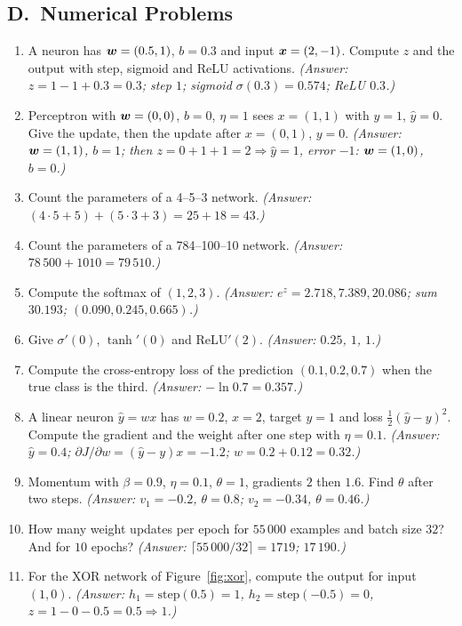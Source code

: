 \subsection*{D.\ Numerical Problems}
\begin{enumerate}
  \item A neuron has $\boldsymbol{w}=(0.5,1)$, $b=0.3$ and input $\boldsymbol{x}=(2,-1)$. Compute $z$ and the output with step, sigmoid and ReLU activations. \textit{(Answer: $z=1-1+0.3=0.3$; step $1$; sigmoid $\sigma(0.3)=0.574$; ReLU $0.3$.)}
  \item Perceptron with $\boldsymbol{w}=(0,0)$, $b=0$, $\eta=1$ sees $x=(1,1)$ with $y=1$, $\hat y=0$. Give the update, then the update after $x=(0,1)$, $y=0$. \textit{(Answer: $\boldsymbol{w}=(1,1)$, $b=1$; then $z=0+1+1=2\Rightarrow\hat y=1$, error $-1$: $\boldsymbol{w}=(1,0)$, $b=0$.)}
  \item Count the parameters of a 4--5--3 network. \textit{(Answer: $(4\cdot5+5)+(5\cdot3+3)=25+18=43$.)}
  \item Count the parameters of a 784--100--10 network. \textit{(Answer: $78\,500+1010=79\,510$.)}
  \item Compute the softmax of $(1,2,3)$. \textit{(Answer: $e^z=2.718,7.389,20.086$; sum $30.193$; $(0.090,0.245,0.665)$.)}
  \item Give $\sigma'(0)$, $\tanh'(0)$ and ReLU$'(2)$. \textit{(Answer: $0.25$, $1$, $1$.)}
  \item Compute the cross-entropy loss of the prediction $(0.1,0.2,0.7)$ when the true class is the third. \textit{(Answer: $-\ln0.7=0.357$.)}
  \item A linear neuron $\hat y=wx$ has $w=0.2$, $x=2$, target $y=1$ and loss $\frac12(\hat y-y)^2$. Compute the gradient and the weight after one step with $\eta=0.1$. \textit{(Answer: $\hat y=0.4$; $\partial J/\partial w=(\hat y-y)x=-1.2$; $w=0.2+0.12=0.32$.)}
  \item Momentum with $\beta=0.9$, $\eta=0.1$, $\theta=1$, gradients $2$ then $1.6$. Find $\theta$ after two steps. \textit{(Answer: $v_1=-0.2$, $\theta=0.8$; $v_2=-0.34$, $\theta=0.46$.)}
  \item How many weight updates per epoch for $55\,000$ examples and batch size $32$? And for $10$ epochs? \textit{(Answer: $\lceil55\,000/32\rceil=1719$; $17\,190$.)}
  \item For the XOR network of Figure~\ref{fig:xor}, compute the output for input $(1,0)$. \textit{(Answer: $h_1=\text{step}(0.5)=1$, $h_2=\text{step}(-0.5)=0$, $z=1-0-0.5=0.5\Rightarrow1$.)}
\end{enumerate}

